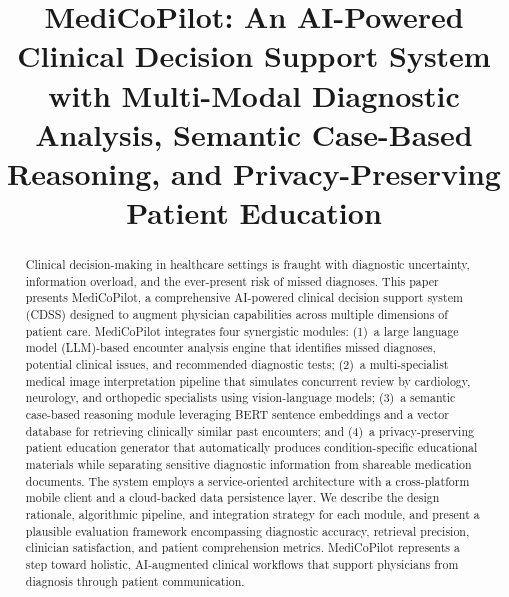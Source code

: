 \documentclass[conference]{IEEEtran}
\begin{document}
\title{MediCoPilot: An AI-Powered Clinical Decision Support System with Multi-Modal Diagnostic Analysis, Semantic Case-Based Reasoning, and Privacy-Preserving Patient Education}

\author{
}

\maketitle

\begin{abstract}
Clinical decision-making in healthcare settings is fraught with diagnostic uncertainty, information overload, and the ever-present risk of missed diagnoses. This paper presents MediCoPilot, a comprehensive AI-powered clinical decision support system (CDSS) designed to augment physician capabilities across multiple dimensions of patient care. MediCoPilot integrates four synergistic modules: (1)~a large language model (LLM)-based encounter analysis engine that identifies missed diagnoses, potential clinical issues, and recommended diagnostic tests; (2)~a multi-specialist medical image interpretation pipeline that simulates concurrent review by cardiology, neurology, and orthopedic specialists using vision-language models; (3)~a semantic case-based reasoning module leveraging BERT sentence embeddings and a vector database for retrieving clinically similar past encounters; and (4)~a privacy-preserving patient education generator that automatically produces condition-specific educational materials while separating sensitive diagnostic information from shareable medication documents. The system employs a service-oriented architecture with a cross-platform mobile client and a cloud-backed data persistence layer. We describe the design rationale, algorithmic pipeline, and integration strategy for each module, and present a plausible evaluation framework encompassing diagnostic accuracy, retrieval precision, clinician satisfaction, and patient comprehension metrics. MediCoPilot represents a step toward holistic, AI-augmented clinical workflows that support physicians from diagnosis through patient communication.
\end{abstract}
\end{document}
